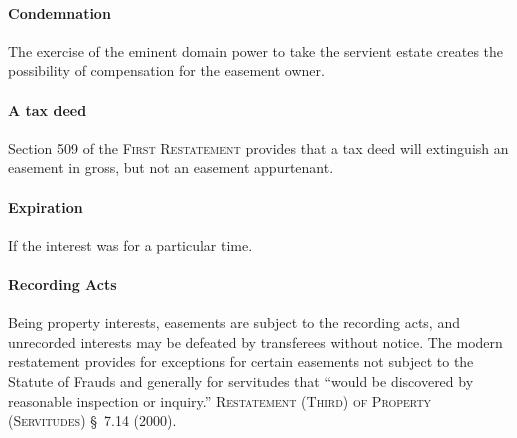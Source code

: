 \paragraph{Condemnation} The exercise of the eminent domain power to take
the servient estate creates the possibility of compensation for the easement
owner.


\paragraph{A tax deed} Section 509 of the \textsc{First Restatement}
provides that a tax deed will extinguish an easement in gross, but not an
easement appurtenant. 



\paragraph{Expiration} If the interest was for a particular time.


\paragraph{Recording Acts} Being property interests, easements are subject
to the recording acts, and unrecorded interests may be defeated by transferees
without notice. The modern restatement provides for exceptions for certain
easements not subject to the Statute of Frauds and generally for servitudes that
``would be discovered by reasonable inspection or inquiry.'' \textsc{Restatement
(Third) of Property (Servitudes)} \S~7.14 (2000).
